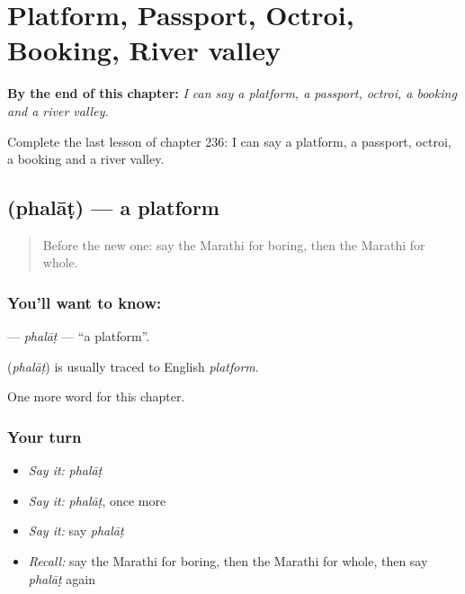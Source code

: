 
\chapter{Platform, Passport, Octroi, Booking, River valley}
\label{ch:mr-platform-passport-octroi-booking-river-valley}

\begin{chapteropening}
\textbf{By the end of this chapter:} \emph{I can say a platform, a passport, octroi, a booking and a river valley.}

Complete the last lesson of chapter 236: I can say a platform, a passport, octroi, a booking and a river valley.
\end{chapteropening}

\section[\texorpdfstring{\mr{फलाट} (phalāṭ)}{फलाट (phalāṭ)}]{ (phalāṭ) — a platform}

\label{lesson:MR-C236-phalat}



\begin{quote}
Before the new one: say the Marathi for boring, then the Marathi for whole.
\end{quote}

\subsection*{You'll want to know: }
\textbf{} — \emph{phalāṭ} — \textquotedblleft{}a platform\textquotedblright{}.

\begin{cousinweb}
\textbf{} (\emph{phalāṭ}) is usually traced to English \emph{platform}.
\end{cousinweb}

\begin{grammarlens}[title={What you've built}]
One more word for this chapter.
\end{grammarlens}

\subsection*{Your turn}
\begin{itemize}
\raggedright
  \item \emph{Say it:} \emph{phalāṭ}
  \item \emph{Say it:} \emph{phalāṭ}, once more
  \item \emph{Say it:} say \emph{phalāṭ}
  \item \emph{Recall:} say the Marathi for boring, then the Marathi for whole, then say \emph{phalāṭ} again
\end{itemize}

